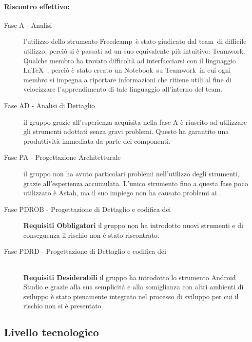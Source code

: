 \documentclass[../PianoProgetto.tex]{subfiles}
\begin{document}
	\paragraph*{Riscontro effettivo:} 
		\begin{description}
			\item[Fase A - Analisi] l'utilizzo dello strumento Freedcamp\g\ è stato giudicato dal team\g\ di difficile utilizzo, perciò si è passati ad un suo equivalente più intuitivo: Teamwork\g .
	Qualche membro ha trovato difficoltà ad interfacciarsi con il linguaggio \LaTeX\  , perciò è stato creato un Notebook\g\ su Teamwork\g\ in cui ogni membro si impegna a riportare informazioni che ritiene utili al fine di velocizzare l'apprendimento di tale linguaggio all'interno del team\g .
			\item[Fase AD - Analisi di Dettaglio] il gruppo grazie all'esperienza acquisita nella fase A è riuscito ad utilizzare gli strumenti adottati senza gravi problemi. Questo ha garantito una produttività immediata da parte dei componenti. 
			\item[Fase PA - Progettazione Architetturale] il gruppo non ha avuto particolari problemi nell'utilizzo degli strumenti, grazie all'esperienza accumulata. L'unico strumento fino a questa fase poco utilizzato è Astah\g, ma il suo impiego non ha causato problemi ai \progettisti.
			\item[Fase PDROB - Progettazione di Dettaglio e codifica dei]
			\textbf{Requisiti Obbligatori} il gruppo non ha introdotto nuovi strumenti e di conseguenza il rischio non è stato riscontrato. \ \\
					 
			\item[Fase PDRD - Progettazione di Dettaglio e codifica dei] \ \\
					\textbf{Requisiti Desiderabili} il gruppo ha introdotto lo strumento Android Studio e grazie alla sua semplicità e alla somiglianza con altri ambienti di sviluppo è stato pienamente integrato nel processo di sviluppo per cui il rischio non si è presentato.
		\end{description}
		
\newpage
\subsection{Livello tecnologico}
\end{document}
